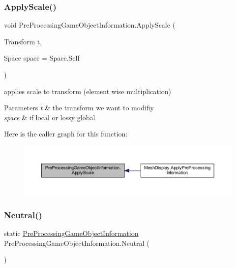 \subsubsection{\texorpdfstring{Apply\+Scale()}{ApplyScale()}}
{\footnotesize\ttfamily void Pre\+Processing\+Game\+Object\+Information.\+Apply\+Scale (\begin{DoxyParamCaption}\item[{Transform}]{t,  }\item[{Space}]{space = {\ttfamily Space.Self} }\end{DoxyParamCaption})}



applies scale to transform (element wise multiplication) 


\begin{DoxyParams}{Parameters}
{\em t} & the transform we want to modifiy\\
\hline
{\em space} & if local or lossy global\\
\hline
\end{DoxyParams}
Here is the caller graph for this function\+:
\nopagebreak
\begin{figure}[H]
\begin{center}
\leavevmode
\includegraphics[width=350pt]{class_pre_processing_game_object_information_ae5ce78a8438afe10ba171442ea863c00_icgraph}
\end{center}
\end{figure}
\mbox{\label{class_pre_processing_game_object_information_aec5a374a598a20e933424c6891ed5d99}} 
\subsubsection{\texorpdfstring{Neutral()}{Neutral()}}
{\footnotesize\ttfamily static \mbox{\hyperlink{class_pre_processing_game_object_information}{Pre\+Processing\+Game\+Object\+Information}} Pre\+Processing\+Game\+Object\+Information.\+Neutral (\begin{DoxyParamCaption}{ }\end{DoxyParamCaption})\hspace{0.3cm}{\ttfamily [static]}}




